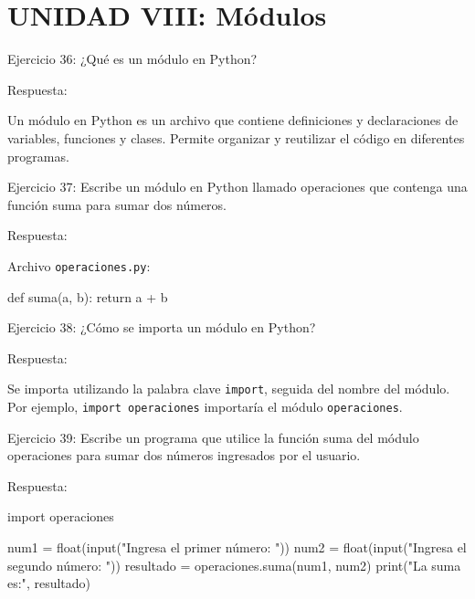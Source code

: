 \documentclass[
  a4paper,
  DIV=11,
  numbers=noendperiod,
  onepage,
  openany]{scrreprt}
\newenvironment{Shaded}{\begin{snugshade}}{\end{snugshade}}
\newcommand{\BuiltInTok}[1]{\textcolor[rgb]{0.00,0.23,0.31}{#1}}
\newcommand{\ControlFlowTok}[1]{\textcolor[rgb]{0.00,0.23,0.31}{#1}}
\newcommand{\ImportTok}[1]{\textcolor[rgb]{0.00,0.46,0.62}{#1}}
\newcommand{\KeywordTok}[1]{\textcolor[rgb]{0.00,0.23,0.31}{#1}}
\newcommand{\NormalTok}[1]{\textcolor[rgb]{0.00,0.23,0.31}{#1}}
\newcommand{\OperatorTok}[1]{\textcolor[rgb]{0.37,0.37,0.37}{#1}}
\newcommand{\StringTok}[1]{\textcolor[rgb]{0.13,0.47,0.30}{#1}}
\begin{document}
\hypertarget{unidad-viii-muxf3dulos}{%
\section{UNIDAD VIII: Módulos}\label{unidad-viii-muxf3dulos}}

Ejercicio 36: ¿Qué es un módulo en Python?

Respuesta:

Un módulo en Python es un archivo que contiene definiciones y
declaraciones de variables, funciones y clases. Permite organizar y
reutilizar el código en diferentes programas.

Ejercicio 37: Escribe un módulo en Python llamado operaciones que
contenga una función suma para sumar dos números.

Respuesta:

Archivo \texttt{operaciones.py}:

\begin{Shaded}
\begin{Highlighting}[]
\KeywordTok{def}\NormalTok{ suma(a, b):}
    \ControlFlowTok{return}\NormalTok{ a }\OperatorTok{+}\NormalTok{ b}
\end{Highlighting}
\end{Shaded}

Ejercicio 38: ¿Cómo se importa un módulo en Python?

Respuesta:

Se importa utilizando la palabra clave \texttt{import}, seguida del
nombre del módulo. Por ejemplo, \texttt{import\ operaciones} importaría
el módulo \texttt{operaciones}.

Ejercicio 39: Escribe un programa que utilice la función suma del módulo
operaciones para sumar dos números ingresados por el usuario.

Respuesta:

\begin{Shaded}
\begin{Highlighting}[]
\ImportTok{import}\NormalTok{ operaciones}

\NormalTok{num1 }\OperatorTok{=} \BuiltInTok{float}\NormalTok{(}\BuiltInTok{input}\NormalTok{(}\StringTok{"Ingresa el primer número: "}\NormalTok{))}
\NormalTok{num2 }\OperatorTok{=} \BuiltInTok{float}\NormalTok{(}\BuiltInTok{input}\NormalTok{(}\StringTok{"Ingresa el segundo número: "}\NormalTok{))}
\NormalTok{resultado }\OperatorTok{=}\NormalTok{ operaciones.suma(num1, num2)}
\BuiltInTok{print}\NormalTok{(}\StringTok{"La suma es:"}\NormalTok{, resultado)}
\end{Highlighting}
\end{Shaded}
\end{document}
